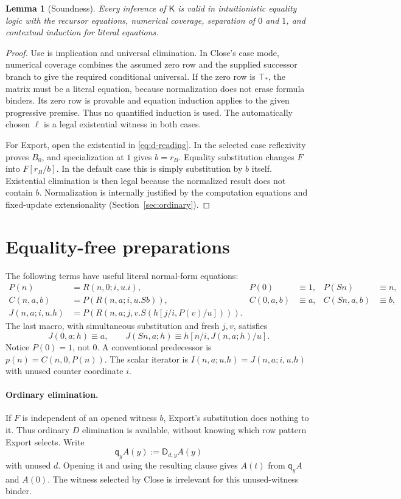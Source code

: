 \documentclass[11pt,letterpaper]{article}
\newtheorem{lemma}[theorem]{Lemma}
\theoremstyle{definition}\newtheorem{definition}[theorem]{Definition}
\theoremstyle{remark}\newtheorem{remark}[theorem]{Remark}
\newcommand{\K}{\mathsf K}
\newcommand{\DD}{\mathsf D}
\newcommand{\qq}{\mathsf q}
\newcommand{\ttop}{\top_*}
\begin{document}
\begin{lemma}[Soundness]\label{lem:sound}
Every inference of $\K$ is valid in intuitionistic equality logic with
the recursor equations, numerical coverage, separation of $0$ and $1$,
and contextual induction for literal equations.
\end{lemma}
\begin{proof}
Use is implication and universal elimination. In Close's case mode,
numerical coverage combines the assumed zero row and the supplied
successor branch to give the required conditional universal. If the
zero row is $\ttop$, the matrix must be a literal equation, because
normalization does not erase formula binders. Its zero row is provable
and equation induction applies to the given progressive premise.
Thus no quantified induction is used. The automatically chosen $\ell$
is a legal existential witness in both cases.

For Export, open the existential in \eqref{eq:d-reading}. In the
selected case reflexivity proves $B_0$, and specialization at $1$
gives $b=r_B$. Equality substitution changes $F$ into $F[r_B/b]$.
In the default case this is simply substitution by $b$ itself.
Existential elimination is then legal because the normalized result
does not contain $b$. Normalization is internally justified by the
computation equations and fixed-update extensionality
(Section~\ref{sec:ordinary}).
\end{proof}

\section{Equality-free preparations}\label{sec:preparations}
The following terms have useful literal normal-form equations:
\begin{align*}
 P(n)&=R(n,0;i,u.i),& P(0)&\equiv1,&P(Sn)&\equiv n,\\
 C(n,a,b)&=P(R(n,a;i,u.Sb)),& C(0,a,b)&\equiv a,&C(Sn,a,b)&\equiv b,\\
 J(n,a;i,u.h)&=P(R(n,a;j,v.S(h[j/i,P(v)/u]))).
\end{align*}
The last macro, with simultaneous substitution and fresh $j,v$, satisfies
\[
 J(0,a;h)\equiv a,\qquad
 J(Sn,a;h)\equiv h[n/i,J(n,a;h)/u].
\]
Notice $P(0)=1$, not $0$. A conventional predecessor is
$p(n)=C(n,0,P(n))$. The scalar iterator is $I(n,a;u.h)=J(n,a;i,u.h)$
with unused counter coordinate $i$.

\paragraph{Ordinary elimination.}
If $F$ is independent of an opened witness $b$, Export's substitution
does nothing to it. Thus ordinary $D$ elimination is available, without
knowing which row pattern Export selects. Write
\[
                    \qq_y A(y):=\DD_{d,y}A(y)
\]
with unused $d$. Opening it and using the resulting clause gives
$A(t)$ from $\qq_yA$ and $A(0)$. The witness selected by Close is
irrelevant for this unused-witness binder.
\end{document}
